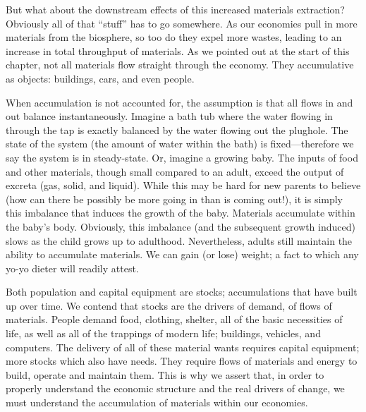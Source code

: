 But what about the downstream effects of this increased materials extraction?
Obviously all of that ``stuff'' has to go somewhere.
As our economies pull in more materials from the biosphere,
so too do they expel more wastes,
leading to an increase in total throughput of materials.
As we pointed out at the start of this chapter,
not all materials flow straight through the economy.
They accumulative as objects: buildings, cars, and even people.


When accumulation is not accounted for,
the assumption is that all flows in and out balance
instantaneously.
Imagine a bath tub where the water flowing in
through the tap is exactly balanced by the water
flowing out the plughole.
The state of the system 
(the amount of water within the bath) is 
fixed---therefore we say the system is in
steady-state.
Or, imagine a growing baby.
The inputs of food and other materials,
though small compared to an adult,
exceed the output of excreta
(gas, solid, and liquid).
While this may be hard for new parents to believe
(how can there be possibly be more going in than is coming out!),
it is simply this imbalance that induces the growth of the baby.
Materials accumulate within the baby's body.
Obviously, 
this imbalance (and the subsequent growth induced)
slows as the child grows up to adulthood.
Nevertheless,
adults still maintain the ability to accumulate
materials.
We can gain (or lose) weight;
a fact to which any yo-yo dieter will readily attest.

Both population and capital equipment are stocks;
accumulations that have built up over time.
We contend that stocks are the drivers of demand,
of flows of materials.
People demand food, clothing, shelter, all of the basic necessities of life,
as well as all of the trappings of modern life; buildings, vehicles, and computers.
The delivery of all of these material wants requires
capital equipment;
more stocks which also have needs.
They require flows of materials and energy to build, operate and maintain them.
This is why we assert that,
in order to properly understand the economic structure
and the real drivers of change,
we must understand the accumulation of materials within our economies.


